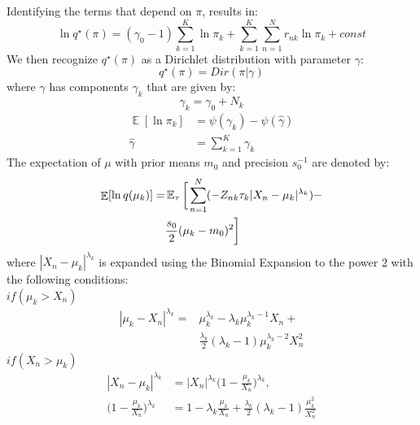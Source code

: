 \documentclass[conference]{IEEEtran}
\begin{document}
Identifying the terms that depend on $\pi$, results in:
\begin{equation}
    \ln q^\star(\pi) = (\gamma_0 - 1)\sum_{k=1}^{K}\ln \pi_k + \sum_{k=1}^{K}\sum_{n=1}^{N} r_{nk} \ln \pi_k + const
\end{equation}
We then recognize $q^\star(\pi)$ as a Dirichlet distribution with parameter $\gamma$:
\begin{equation}
    q^\star(\pi) =  Dir(\pi|\gamma)
\end{equation}
where $\gamma$ has components $\gamma_k$ that are given by:
\begin{equation}\label{gammak}
    \gamma_k = \gamma_0 + N_k
\end{equation}   
    \begin{equation}
        \begin{split}
            \mathop{\mathbb{E}}[\ln \pi_k] &= \psi(\gamma_k) - \psi(\hat{\gamma})\\
            \hat{\gamma} &= \sum_{k=1}^{K} \gamma_k
        \end{split}
    \end{equation}
    The expectation of $\mu$ with prior means $m_0$ and precision $ s_0^{-1}$ are denoted by:
    \begin{align}
    \begin{split}
    \mathop{\mathbb{E}}[\ln q(\mu_k)] = &\mathop{\mathbb{E}_\tau}\bigg[\sum_{\mathclap{n=1}}^{N}(-Z_{nk}\tau_k|X_n - \mu_k|^{\lambda_k}) - \\
    &\frac{s_0}{2}(\mu_k - m_0)^2\bigg]
    \end{split}
    \end{align}
    where $|X_n - \mu_k|^{\lambda_k}$ is expanded using the Binomial Expansion to the power 2 with the following conditions:\\
    $if(\mu_k > X_n )$
    \begin{equation}
        \begin{split}
            |\mu_k - X_n|^{\lambda_k}=&\mu_k^{\lambda_k} - \lambda_k \mu_k^{\lambda_k - 1} X_n +\\
            &\frac{\lambda_k}{2} (\lambda_k - 1) \mu_k^{\lambda_k - 2} X_n^2
        \end{split}
    \end{equation}
    $if(X_n>\mu_k)$
    \begin{equation}
        \begin{split}
            |X_n-\mu_k|^{\lambda_k} &= |X_n|^{\lambda_k}\bigg(1 - \frac{\mu_k}{X_n}\bigg)^{\lambda_k},\\
            \bigg(1 - \frac{\mu_k}{X_n}\bigg)^{\lambda_k} &= 1 - \lambda_k \frac{\mu_k}{X_n} + \frac{\lambda_k}{2}(\lambda_k-1) \frac{\mu_k^2}{X_n^2}
        \end{split}
    \end{equation}
\end{document}
